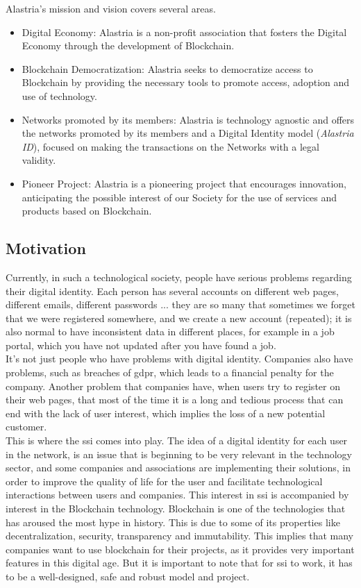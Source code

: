 Alastria's mission and vision covers several areas.
\begin{itemize}
    \item Digital Economy: Alastria is a non-profit association that fosters the Digital Economy through the development of Blockchain.
    \item Blockchain Democratization: Alastria seeks to democratize access to Blockchain by providing the necessary tools to promote access, adoption and use of technology.
    \item Networks promoted by its members: Alastria is technology agnostic and offers the networks promoted by its members and a Digital Identity model (\textit{Alastria ID}), focused on making the transactions on the Networks with a legal validity.
    \item Pioneer Project: Alastria is a pioneering project that encourages innovation, anticipating the possible interest of our Society for the use of services and products based on Blockchain.
\end{itemize}

\subsection{Motivation}
Currently, in such a technological society, people have serious problems regarding their digital identity. Each person has several accounts on different web pages, different emails, different passwords ... they are so many that sometimes we forget that we were registered somewhere, and we create a new account (repeated); it is also normal to have inconsistent data in different places, for example in a job portal, which you have not updated after you have found a job.\\

It's not just people who have problems with digital identity. Companies also have problems, such as breaches of \acrshort{gdpr}, which leads to a financial penalty for the company. Another problem that companies have, when users try to register on their web pages, that most of the time it is a long and tedious process that can end with the lack of user interest, which implies the loss of a new potential customer.\\

This is where the \acrlong{ssi} comes into play. The idea of a digital identity for each user in the network, is an issue that is beginning to be very relevant in the technology sector, and some companies and associations are implementing their solutions, in order to improve the quality of life for the user and facilitate technological interactions between users and companies. This interest in \acrlong{ssi} is accompanied by interest in the Blockchain technology. Blockchain is one of the technologies that has aroused the most hype in history. This is due to some of its properties like decentralization, security, transparency and immutability. This implies that many companies want to use blockchain for their projects, as it provides very important features in this digital age. But it is important to note that for \acrlong{ssi} to work, it has to be a well-designed, safe and robust model and project.\\

